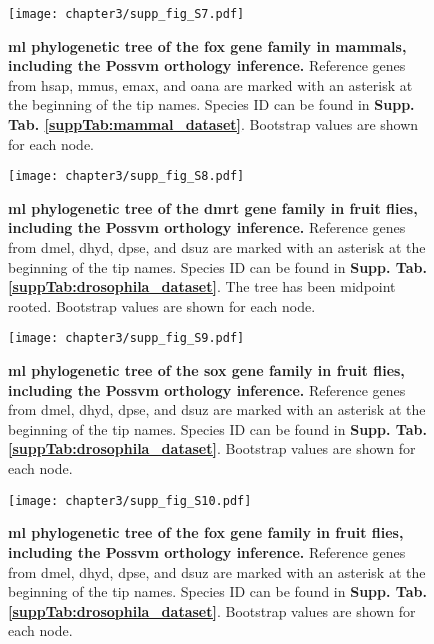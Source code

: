 \documentclass[../main.tex]{subfiles}
\begin{document}
\begin{figure}[ht]
	\centering
	\texttt{[image: chapter3/supp\_fig\_S7.pdf]}
	\captionsetup{width=\textwidth}
	\caption{
		\textbf{\gls{ml} phylogenetic tree of the \gls{fox} gene family in mammals, including the Possvm orthology inference.} Reference genes from \gls{hsap}, \gls{mmus}, \gls{emax}, and \gls{oana} are marked with an asterisk at the beginning of the tip names. Species ID can be found in \textbf{Supp. Tab. \ref{suppTab:mammal_dataset}}. Bootstrap values are shown for each node.
	}
	\label{suppFig:fox_mammals}
\end{figure}

\begin{figure}[ht]
	\centering
	\texttt{[image: chapter3/supp\_fig\_S8.pdf]}
	\captionsetup{width=\textwidth}
	\caption{
		\textbf{\gls{ml} phylogenetic tree of the \gls{dmrt} gene family in fruit flies, including the Possvm orthology inference.} Reference genes from \gls{dmel}, \gls{dhyd}, \gls{dpse}, and \gls{dsuz} are marked with an asterisk at the beginning of the tip names. Species ID can be found in \textbf{Supp. Tab. \ref{suppTab:drosophila_dataset}}. The tree has been midpoint rooted. Bootstrap values are shown for each node.
	}
	\label{suppFig:dmrt_drosophila}
\end{figure}

\begin{figure}[ht]
	\centering
	\texttt{[image: chapter3/supp\_fig\_S9.pdf]}
	\captionsetup{width=\textwidth}
	\caption{
		\textbf{\gls{ml} phylogenetic tree of the \gls{sox} gene family in fruit flies, including the Possvm orthology inference.} Reference genes from \gls{dmel}, \gls{dhyd}, \gls{dpse}, and \gls{dsuz} are marked with an asterisk at the beginning of the tip names. Species ID can be found in \textbf{Supp. Tab. \ref{suppTab:drosophila_dataset}}. Bootstrap values are shown for each node.
	}
	\label{suppFig:sox_drosophila}
\end{figure}

\begin{figure}[ht]
	\centering
	\texttt{[image: chapter3/supp\_fig\_S10.pdf]}
	\captionsetup{width=\textwidth}
	\caption{
		\textbf{\gls{ml} phylogenetic tree of the \gls{fox} gene family in fruit flies, including the Possvm orthology inference.} Reference genes from \gls{dmel}, \gls{dhyd}, \gls{dpse}, and \gls{dsuz} are marked with an asterisk at the beginning of the tip names. Species ID can be found in \textbf{Supp. Tab. \ref{suppTab:drosophila_dataset}}. Bootstrap values are shown for each node.
	}
	\label{suppFig:fox_drosophila}
\end{figure}
\end{document}
